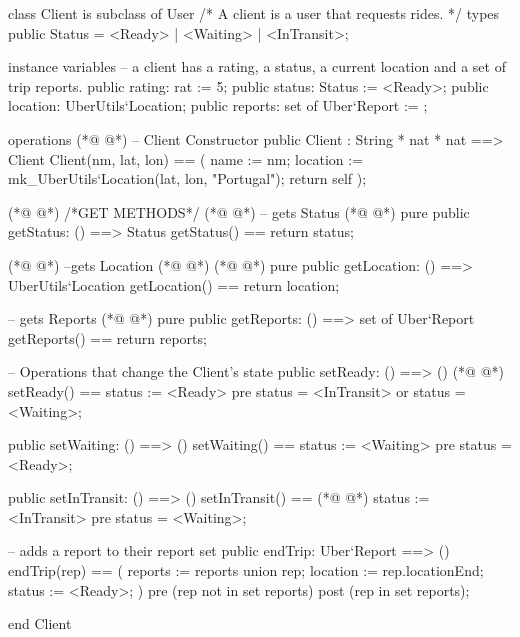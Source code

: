 \begin{vdmpp}[breaklines=true]
class Client is subclass of User
/*
    A client is a user that requests rides.
*/
types
    public Status = <Ready> | <Waiting> | <InTransit>;
    
instance variables
    -- a client has a rating, a status, a current location and a set of trip reports.
    public rating: rat := 5;
    public status: Status := <Ready>;
    public location: UberUtils`Location;
    public reports: set of Uber`Report := {};

operations
(*@
\label{Client:16}
@*)
  -- Client Constructor
    public Client : String * nat * nat ==> Client
        Client(nm, lat, lon) == (
            name := nm;
            location := mk_UberUtils`Location(lat, lon, "Portugal");
            return self
        );
  
(*@
\label{setReady:24}
@*)
  /*GET METHODS*/
(*@
\label{getName:25}
@*)
  -- gets Status
(*@
\label{getStatus:26}
@*)
  pure public getStatus: () ==> Status
  getStatus() == return status;
  
(*@
\label{setWaiting:29}
@*)
  --gets Location
(*@
\label{getLocation:30}
@*)
(*@
\label{getReports:30}
@*)
  pure public getLocation: () ==> UberUtils`Location
  getLocation() == return location;
  
  -- gets Reports
(*@
\label{setInTransit:34}
@*)
  pure public getReports: () ==> set of Uber`Report
  getReports() == return reports;
  
    -- Operations that change the Client's state
    public setReady: () ==> ()
(*@
\label{addReport:39}
@*)
        setReady() ==
        status := <Ready>
        pre status = <InTransit> or status = <Waiting>;
        
    public setWaiting: () ==> ()
        setWaiting() ==
            status := <Waiting>
            pre status = <Ready>;
    
    public setInTransit: () ==> ()
        setInTransit() ==
(*@
\label{endTrip:50}
@*)
            status := <InTransit>
            pre status = <Waiting>;
    
    -- adds a report to their report set
    public endTrip: Uber`Report ==> ()
        endTrip(rep) == (
            reports := reports union {rep};
            location := rep.locationEnd;
            status := <Ready>;
        )    
        pre (rep not in set reports)
        post (rep in set reports);
            
end Client
\end{vdmpp}
